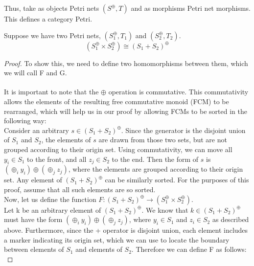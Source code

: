 %
%
Thus, take as objects Petri nets $(S^\oplus, T)$ and as morphisms Petri net morphisms. This defines a category Petri.
\begin{lemma}
Suppose we have two Petri nets, $(S_1^\oplus, T_1)$ and $(S_2^\oplus, T_2)$.\\ 
\[(S_1 ^\oplus \times S_2 ^\oplus) \cong (S_1 + S_2)^\oplus\]
\begin{proof}
To show this, we need to define two homomorphisms between them, which we will call F and G.\\
\bigskip\\
It is important to note that the $\oplus$ operation is commutative. This commutativity allows the elements of the resulting free commutative monoid (FCM) to be rearranged, which will help us in our proof by allowing FCMs to be sorted in the following way:\bigskip\\
Consider an arbitrary $s \in (S_1 + S_2)^\oplus$. Since the generator is the disjoint union of $S_1$ and $S_2$, the elements of $s$ are drawn from those two sets, but are not grouped according to their origin set. Using commutativity, we can move all $y_i \in S_1$ to the front, and all $z_j \in S_2$ to the end. Then the form of $s$ is $(\oplus_i y_i) \oplus (\oplus_j z_j)$, where the elements are grouped according to their origin set. Any element of $(S_1 + S_2)^\oplus$ can be similarly sorted. For the purposes of this proof, assume that all such elements are so sorted.\bigskip \\
Now, let us define the function $F: (S_1 + S_2)^\oplus \to (S_1 ^\oplus \times S_2 ^\oplus)$.\\
Let k be an arbitrary element of $(S_1 + S_2)^\oplus$. We know that $k \in (S_1 + S_2)^\oplus$ must have the form $(\oplus_i y_i) \oplus (\oplus_j z_j)$, where $y_i \in S_1$ and $z_i \in S_2$ as described above. Furthermore, since the + operator is disjoint union, each element includes a marker indicating its origin set, which we can use to locate the boundary between elements of $S_1$ and elements of $S_2$. Therefore we can define F as follows:\\

\end{proof}
\end{lemma}
